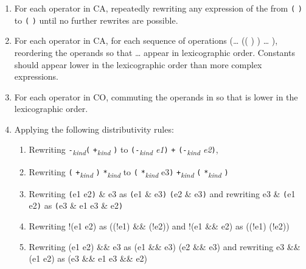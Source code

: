 \begin{enumerate}
\item
  For each operator  in CA, repeatedly rewriting any expression
  of the from   \texttt{(} 
  \texttt{)} to \texttt{(} 
  \texttt{)}   until no further rewrites are
  possible.
\item
  For each operator  in CA, for each sequence of operations
  (\ldots{} ((  )  )
  \ldots{}  ), reordering the operands so that
   \ldots{}  appear in lexicographic order. Constants
  should appear lower in the lexicographic order than more complex
  expressions.
\item
  For each operator  in CO, commuting the operands in 
    so that  is lower in the lexicographic
  order.
\item
  Applying the following distributivity rules:

  \begin{enumerate}
  \item
    Rewriting \texttt{-}\emph{\textsubscript{kind}}\texttt{(}
    \texttt{+}\emph{\textsubscript{kind}} \texttt{)} to
    \texttt{(-}\emph{\textsubscript{kind} e1}\texttt{)} \texttt{+}
    \texttt{(-}\emph{\textsubscript{kind} e2}\texttt{)},
  \item
    Rewriting \texttt{(} \texttt{+}\emph{\textsubscript{kind}}
    \texttt{)} \texttt{*}\emph{\textsubscript{kind}} 
    to \texttt{(} \texttt{*}\emph{\textsubscript{kind}}
    e3\texttt{)} \texttt{+}\emph{\textsubscript{kind}}
    \texttt{(} \texttt{*}\emph{\textsubscript{kind}}
    \texttt{)}
  \item
    Rewriting \texttt{(}e1 \textbar{} e2\texttt{)} \& e3 as \texttt{(}e1
    \& e3\texttt{)} \textbar{} \texttt{(}e2 \& e3\texttt{)} and
    rewriting e3 \& \texttt{(}e1 \textbar{} e2\texttt{)} as \texttt{(}e3
    \& e1 \textbar{} e3 \& e2\texttt{)}
  \item
    Rewriting !(e1 \textbar{}\textbar{} e2) as ((!e1) \&\& (!e2)) and
    !(e1 \&\& e2) as ((!e1) \textbar{}\textbar{} (!e2))
  \item
    Rewriting (e1 \textbar{}\textbar{} e2) \&\& e3 as (e1 \&\& e3)
    \textbar{}\textbar{} (e2 \&\& e3) and rewriting e3 \&\& (e1
    \textbar{}\textbar{} e2) as (e3 \&\& e1 \textbar{}\textbar{} e3 \&\&
    e2)
  \end{enumerate}
\end{enumerate}

